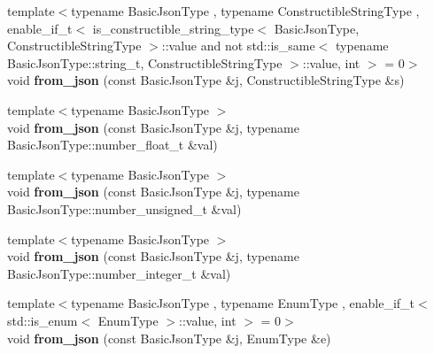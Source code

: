 \begin{DoxyCompactItemize}
\item 
\mbox{\label{namespacenlohmann_1_1detail_a2932f2bc2943dac6d51669312f4fc0f5}} 
{\footnotesize template$<$typename Basic\+Json\+Type , typename Constructible\+String\+Type , enable\+\_\+if\+\_\+t$<$ is\+\_\+constructible\+\_\+string\+\_\+type$<$ Basic\+Json\+Type, Constructible\+String\+Type $>$\+::value and not std\+::is\+\_\+same$<$ typename Basic\+Json\+Type\+::string\+\_\+t, Constructible\+String\+Type $>$\+::value, int $>$  = 0$>$ }\\void {\bfseries from\+\_\+json} (const Basic\+Json\+Type \&j, Constructible\+String\+Type \&s)
\item 
\mbox{\label{namespacenlohmann_1_1detail_a7cb5dd7d46a60e65f9a8e0873b3f7dd8}} 
{\footnotesize template$<$typename Basic\+Json\+Type $>$ }\\void {\bfseries from\+\_\+json} (const Basic\+Json\+Type \&j, typename Basic\+Json\+Type\+::number\+\_\+float\+\_\+t \&val)
\item 
\mbox{\label{namespacenlohmann_1_1detail_ace4d5680ba413d9fd897ccb5d9c61a1c}} 
{\footnotesize template$<$typename Basic\+Json\+Type $>$ }\\void {\bfseries from\+\_\+json} (const Basic\+Json\+Type \&j, typename Basic\+Json\+Type\+::number\+\_\+unsigned\+\_\+t \&val)
\item 
\mbox{\label{namespacenlohmann_1_1detail_a047d881e611fcac709dc318f730a1732}} 
{\footnotesize template$<$typename Basic\+Json\+Type $>$ }\\void {\bfseries from\+\_\+json} (const Basic\+Json\+Type \&j, typename Basic\+Json\+Type\+::number\+\_\+integer\+\_\+t \&val)
\item 
\mbox{\label{namespacenlohmann_1_1detail_a5440d650150d01e8015133521351b459}} 
{\footnotesize template$<$typename Basic\+Json\+Type , typename Enum\+Type , enable\+\_\+if\+\_\+t$<$ std\+::is\+\_\+enum$<$ Enum\+Type $>$\+::value, int $>$  = 0$>$ }\\void {\bfseries from\+\_\+json} (const Basic\+Json\+Type \&j, Enum\+Type \&e)
\item 
\mbox{\label{namespacenlohmann_1_1detail_a5cfb765aad92795abd7fda29d017272a}} 

\end{DoxyCompactItemize}
